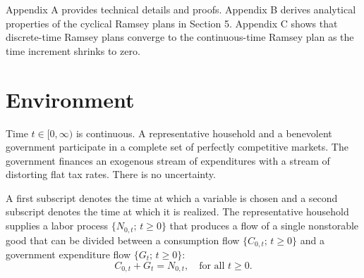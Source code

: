 \documentclass[12pt]{article}
\begin{document}
{%
%

Appendix A provides technical details and proofs. Appendix B derives analytical properties of the cyclical Ramsey plans in Section 5. Appendix C shows that discrete-time Ramsey plans converge to the continuous-time Ramsey plan as the time increment shrinks to zero.


\section{Environment}\label{sec_environ}

Time $t \in [0,\infty)$ is continuous. {A representative household and a benevolent government} participate in a complete set of perfectly competitive markets. The government finances an exogenous stream of expenditures with a stream of distorting flat tax rates. There is no uncertainty. 


{A first subscript denotes the time at which a variable is chosen and a second subscript denotes the time at which it is realized.}
The representative household supplies a labor process $\{N_{0,t};\, t \ge 0\}$ that produces a flow of a single nonstorable good that can be divided between a consumption flow $\{C_{0,t};\, t \ge 0\}$ and a government expenditure flow $\{G_t;\, t \ge 0\}$:
\begin{equation}\label{eq:resource}
C_{0,t} + G_t = N_{0,t}, \quad \text{for all } t \ge 0.
\end{equation}

}
\end{document}
